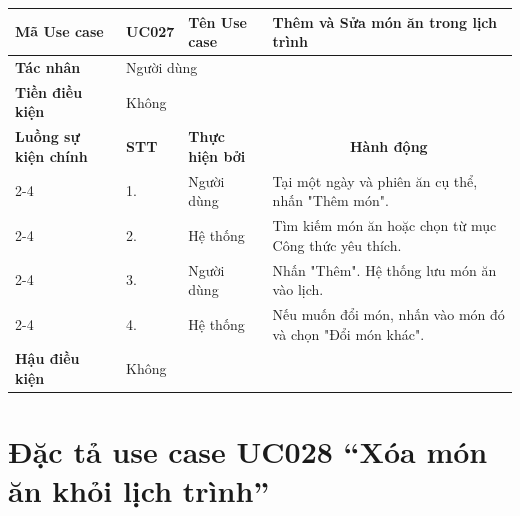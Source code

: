 \begin{longtable}{|p{2.7cm}|p{0.8cm}|p{2.6cm}|p{7.3cm}|}
\hline
\cellcolor[HTML]{D5F5E3}\textbf{Mã Use case} & \multicolumn{1}{l|}{UC027} & \cellcolor[HTML]{D5F5E3}\textbf{Tên Use case} & Thêm và Sửa món ăn trong lịch trình \\ \hline
\cellcolor[HTML]{D5F5E3}\textbf{Tác nhân} & \multicolumn{3}{p{10.7cm}|}{Người dùng} \\ \hline
\cellcolor[HTML]{D5F5E3}\textbf{Tiền điều kiện} & \multicolumn{3}{p{10.7cm}|}{Không} \\ \hline

\cellcolor[HTML]{D5F5E3}\textbf{Luồng sự kiện chính} & \cellcolor[HTML]{FDEBD0}\textbf{STT} & \cellcolor[HTML]{FDEBD0}\textbf{Thực hiện bởi} & \multicolumn{1}{c|}{\cellcolor[HTML]{FDEBD0}\textbf{Hành động}} \\ \cline{2-4} 
\cellcolor[HTML]{D5F5E3} & 1. & Người dùng & Tại một ngày và phiên ăn cụ thể, nhấn "Thêm món". \\ \cline{2-4} 
\cellcolor[HTML]{D5F5E3} & 2. & Hệ thống & Tìm kiếm món ăn hoặc chọn từ mục Công thức yêu thích. \\ \cline{2-4} 
\cellcolor[HTML]{D5F5E3} & 3. & Người dùng & Nhấn "Thêm". Hệ thống lưu món ăn vào lịch. \\ \cline{2-4} 
\cellcolor[HTML]{D5F5E3} & 4. & Hệ thống & Nếu muốn đổi món, nhấn vào món đó và chọn "Đổi món khác". \\ \hline

\cellcolor[HTML]{D5F5E3}\textbf{Hậu điều kiện} & \multicolumn{3}{p{10.7cm}|}{Không} \\ \hline
\end{longtable}
\endgroup

\section{Đặc tả use case UC028 ``Xóa món ăn khỏi lịch trình''}
\vspace{0.5cm}

\begingroup
\renewcommand{\arraystretch}{1.5}

